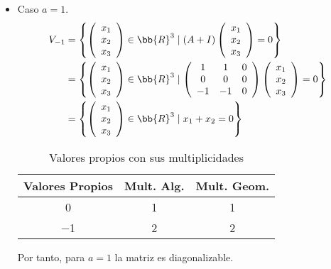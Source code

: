 \begin{ejercicio}
\begin{enumerate}
\begin{itemize}
           \item Caso $a=1$.
           \begin{equation*}\begin{split}
               V_{-1} & = \left\{ \left(\begin{array}{c}
                    x_1 \\
                    x_2 \\
                    x_3
               \end{array}\right) \in \bb{R}^3 \mid (A+I)\left(\begin{array}{c}
                    x_1 \\
                    x_2 \\
                    x_3
               \end{array}\right) = 0 \right\} \\
               & = \left\{ \left(\begin{array}{c}
                    x_1 \\
                    x_2 \\
                    x_3
               \end{array}\right) \in \bb{R}^3 \mid \left( \begin{array}{ccc}
                1 & 1 & 0 \\
                0 & 0 & 0 \\
                -1 & -1 & 0 \\
            \end{array}\right) \left(\begin{array}{c}
                    x_1 \\
                    x_2 \\
                    x_3
               \end{array}\right) = 0 \right\} \\
               & = \left\{ \left(\begin{array}{c}
                    x_1 \\
                    x_2  \\
                    x_3
               \end{array}\right) \in \bb{R}^3 \mid x_1+x_2=0 \right\}
           \end{split}\end{equation*}
           \begin{table}[H]
                \centering
                \begin{tabular}{c|c|c}
                    Valores Propios & Mult. Alg. & Mult. Geom. \\ \hline 
                    0 & 1 & 1\\
                    $-$1 & 2 & 2\\
                \end{tabular}
                \caption{Valores propios con sus multiplicidades}
            \end{table}
            Por tanto, para $a=1$ la matriz es diagonalizable.


\end{itemize}
\end{enumerate}
\end{ejercicio}
